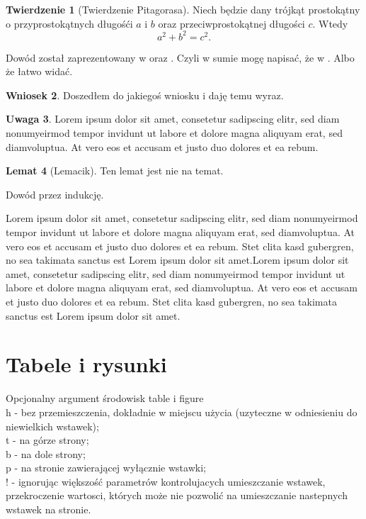 \documentclass[a4paper,11pt,twoside]{report}
\makeatletter
\theoremstyle{definition}
\newtheorem{theorem}{Twierdzenie}[chapter]
\newtheorem{lemma}[theorem]{Lemat}
\newtheorem{corollary}[theorem]{Wniosek}
\newtheorem{remark}[theorem]{Uwaga}
\renewenvironment{proof}[1][\proofname]
{\par
  \vspace{-12pt}%
  \pushQED{\qed}%
  \normalfont
  \topsep0pt \partopsep0pt %
  \trivlist
  \item[\hskip\labelsep
        \sc
    #1\@addpunct{:}]\ignorespaces
}
{%
  \popQED\endtrivlist\@endpefalse
  \addvspace{20pt} %
}
\makeatother
\begin{document}
\begin{theorem}[Twierdzenie Pitagorasa]\label{Pitagoras}
Niech będzie dany trójkąt prostokątny o przyprostokątnych długośći $a$ i $b$ oraz przeciwprostokątnej długości $c$. Wtedy
$$
a^2 + b^2 = c^2.
$$
\end{theorem}

\begin{proof}
Dowód został zaprezentowany w \cite{Ktos} oraz \cite{Innyktos}. Czyli w sumie mogę napisać, że w \cite{Ktos, Innyktos}. Albo że łatwo widać.
\end{proof}

\begin{corollary}
Doszedłem do jakiegoś wniosku i daję temu wyraz.
\end{corollary}




\begin{remark}
Lorem ipsum dolor sit amet, consetetur sadipscing elitr, sed diam nonumyeirmod tempor invidunt ut labore et dolore magna aliquyam erat, sed diamvoluptua. At vero eos et accusam et justo duo dolores et ea rebum.
\end{remark}

\begin{lemma}[Lemacik]
Ten lemat jest nie na temat.
\end{lemma}
\begin{proof} Dowód przez indukcję.
\end{proof}


Lorem ipsum dolor sit amet, consetetur sadipscing elitr, sed diam nonumyeirmod tempor invidunt ut labore et dolore magna aliquyam erat, sed diamvoluptua. At vero eos et accusam et justo duo dolores et ea rebum. Stet clita kasd gubergren, no sea takimata sanctus est Lorem ipsum dolor sit amet.Lorem ipsum dolor sit amet, consetetur sadipscing elitr, sed diam nonumyeirmod tempor invidunt ut labore et dolore magna aliquyam erat, sed diamvoluptua. At vero eos et accusam et justo duo dolores et ea rebum. Stet clita kasd gubergren, no sea takimata sanctus est Lorem ipsum dolor sit amet.



\section{Tabele i rysunki}

 Opcjonalny argument środowisk table i figure\\
h 	- 	bez przemieszczenia, dokładnie w miejscu użycia (uzyteczne w odniesieniu do niewielkich wstawek); \\
t 	- 	na górze strony;\\
b 	- 	na dole strony;\\
p 	- 	na stronie zawierającej wyłącznie wstawki;\\
! 	- 	ignorując większość parametrów kontrolujacych umieszczanie wstawek, przekroczenie wartosci, których może nie pozwolić na umieszczanie nastepnych wstawek na stronie.
\end{document}
